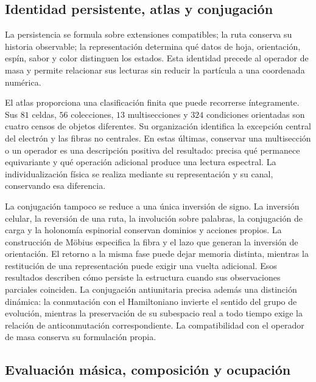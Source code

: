 \subsection{Identidad persistente, atlas y conjugación}

La persistencia se formula sobre extensiones compatibles; la ruta
conserva su historia observable; la representación determina qué datos de
hoja, orientación, espín, sabor y color distinguen los estados. Esta
identidad precede al operador de masa y permite relacionar sus lecturas
sin reducir la partícula a una coordenada numérica.

El atlas proporciona una clasificación finita que puede recorrerse
íntegramente. Sus \(81\) celdas, \(56\) colecciones, \(13\) multisecciones y
\(324\) condiciones orientadas son cuatro censos de objetos diferentes.
Su organización identifica la excepción central del electrón y las
fibras no centrales. En estas últimas, conservar una multisección o un
operador es una descripción positiva del resultado: precisa qué permanece
equivariante y qué operación adicional produce una lectura espectral.
La individualización física se realiza mediante su representación y su
canal, conservando esa diferencia.

La conjugación tampoco se reduce a una única inversión de signo.
La inversión celular, la reversión de una ruta, la involución sobre
palabras, la conjugación de carga y la holonomía espinorial conservan
dominios y acciones propios. La construcción de Möbius especifica la
fibra y el lazo que generan la inversión de orientación. El retorno a la
misma fase puede dejar memoria distinta, mientras la restitución de una
representación puede exigir una vuelta adicional. Esos resultados
describen cómo persiste la estructura cuando sus observaciones parciales
coinciden.
La conjugación antiunitaria precisa además una distinción dinámica:
la conmutación con el Hamiltoniano invierte el sentido del grupo de
evolución, mientras la preservación de su subespacio real a todo tiempo
exige la relación de anticonmutación correspondiente. La compatibilidad
con el operador de masa conserva su formulación propia.

\subsection{Evaluación másica, composición y ocupación}

